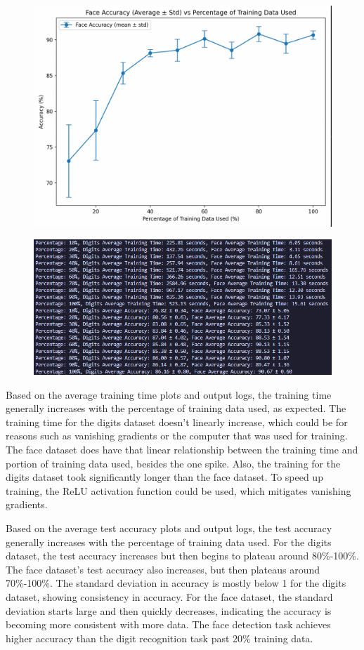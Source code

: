 \documentclass{article}
\begin{document}
\begin{figure}[H]
    \centering
    \includegraphics[width=.75\textwidth]{report/report_figures/nn_face_acc.png}
\end{figure}
\begin{figure}[H]
    \centering
    \includegraphics[width=.75 \textwidth]{report/report_figures/nn_output_log.png}
\end{figure}

\noindent Based on the average training time plots and output logs, the training time generally increases with the percentage of training data used, as expected. The training time for the digits dataset doesn't linearly increase, which could be for reasons such as vanishing gradients or the computer that was used for training. The face dataset does have that linear relationship between the training time and portion of training data used, besides the one spike. Also, the training for the digits dataset took significantly longer than the face dataset. To speed up training, the ReLU activation function could be used, which mitigates vanishing gradients. 

\noindent Based on the average test accuracy plots and output logs, the test accuracy generally increases with the percentage of training data used. For the digits dataset, the test accuracy increases but then begins to plateau around 80\%-100\%. The face dataset's test accuracy also increases, but then plateaus around 70\%-100\%. The standard deviation in accuracy is mostly below 1 for the digits dataset, showing consistency in accuracy. For the face dataset, the standard deviation starts large and then quickly decreases, indicating the accuracy is becoming more consistent with more data. The face detection task achieves higher accuracy than the digit recognition task past 20\% training data.
\end{document}
